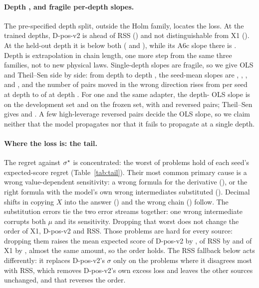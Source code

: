 \paragraph{Depth , and fragile per-depth slopes.}
The pre-specified depth split, outside the Holm family, locates the loss.
At the trained depths, D-pos-v2 is ahead of RSS () and not distinguishable from X1
().
At the held-out depth  it is below both ( and ), while its A6c
slope there is .
Depth  is extrapolation in chain length, one more step from the same three families, not to new
physical laws.
Single-depth slopes are fragile, so we give OLS and Theil--Sen side by side: from depth  to depth
, the seed-mean slopes are
, , ,  and , and the number of pairs moved
in the wrong direction rises from  per seed at depth  to  of
 at depth .
For one and the same adapter, the depth- OLS slope is  on the development
set and  on the frozen set, with  and  reversed
pairs; Theil--Sen gives  and .
A few high-leverage reversed pairs decide the OLS slope, so we claim neither that the model propagates nor that it
fails to propagate at a single depth.

\paragraph{Where the loss is: the tail.}
The regret against $\sigma^{\star}$ is concentrated: the worst  of problems hold  of
each seed's expected-score regret (Table~\ref{tab:tail}).
Their most common primary cause is a wrong value-dependent sensitivity: a wrong formula for the derivative
(), or the right formula with the model's own wrong intermediates substituted
().
Decimal shifts in copying $X$ into the answer () and the wrong chain () follow.
The substitution errors tie the two error streams together: one wrong intermediate corrupts both $\mu$ and its
sensitivity.
Dropping that worst  does not change the order of X1, D-pos-v2 and RSS.
Those problems are hard for every source: dropping them raises the mean expected score of D-pos-v2 by ,
of RSS by  and of X1 by , almost the same amount, so the order
holds.
The RSS fallback below acts differently: it replaces D-pos-v2's $\sigma$ only on the problems where it disagrees most
with RSS, which removes D-pos-v2's own excess loss and leaves the other sources unchanged, and that reverses the order.

